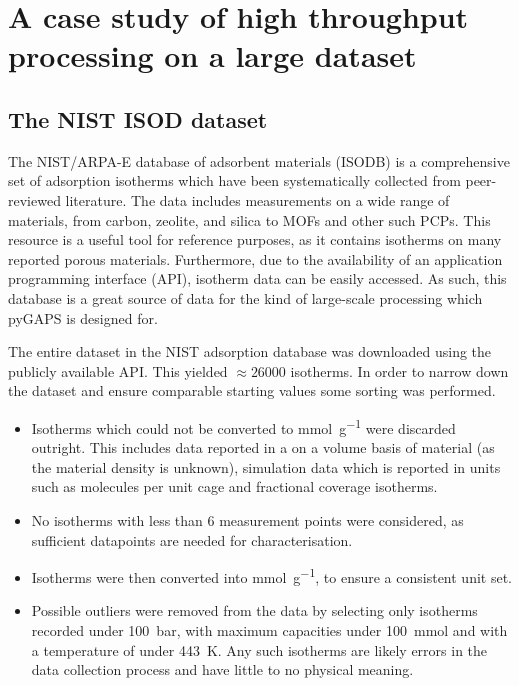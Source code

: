 
\section{A case study of high throughput processing on a large dataset}

\subsection{The NIST ISOD dataset}

The NIST/ARPA-E database of adsorbent materials (ISODB) is a comprehensive
set of adsorption isotherms which have been systematically
collected from peer-reviewed literature. The data includes 
measurements on a wide range of materials, from carbon, zeolite,
and silica to MOFs and other such PCPs. This resource is a useful
tool for reference purposes, as it contains isotherms on many reported
porous materials. Furthermore, due to the availability of an 
application programming interface (API), isotherm data can be easily
accessed. As such, this database is a great 
source of data for the kind of large-scale processing which pyGAPS
is designed for.

The entire dataset in the NIST adsorption database was downloaded using the
publicly available API. This yielded \(\approx \! 26000\) isotherms.
In order to narrow down the dataset and ensure comparable starting values
some sorting was performed.

\begin{itemize}
    \item Isotherms which could not be converted to \si{\milli\mol\per\gram}
    were discarded outright. This includes data reported in a 
    on a volume basis of material (as the material density is 
    unknown), simulation data which is reported in units such 
    as molecules per unit cage and fractional coverage isotherms.
    \item No isotherms with less than 6 measurement points were 
    considered, as sufficient datapoints are needed for characterisation.
    \item Isotherms were then converted into \si{\milli\mol\per\gram},
    to ensure a consistent unit set.
    \item Possible outliers were removed from the data by selecting 
    only isotherms recorded under \SI{100}{\bar}, with maximum capacities
    under \SI{100}{\milli\mol} and with a temperature of under 
    \SI{443}{\kelvin}. Any such isotherms are likely errors in the 
    data collection process and have little to no physical meaning.
\end{itemize}

